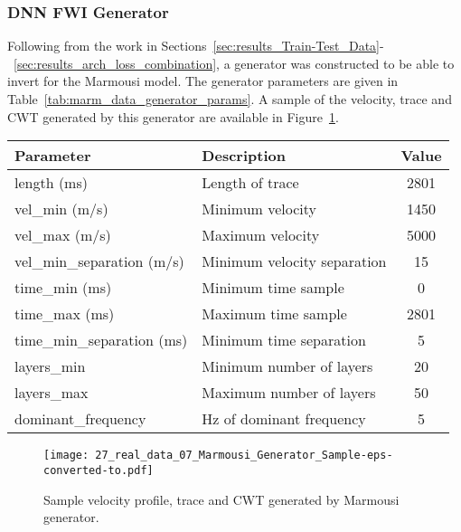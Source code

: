 \subsubsection{DNN FWI Generator}\label{sec:results_marm_generator}
Following from the work in Sections~\ref{sec:results_Train-Test_Data}-~\ref{sec:results_arch_loss_combination}, a generator was constructed to be able to invert for the Marmousi model. The generator parameters are given in Table~\ref{tab:marm_data_generator_params}. A sample of the velocity, trace and CWT generated by this generator are available in Figure~\ref{fig:marm_generator}.
\begin{table*}
    \centering
    \begin{tabular}{@{}llc@{}}\toprule
        Parameter                  & Description                   & Value \\ \hline
        length (ms)                & Length of trace               & 2801  \\
        vel\_min (m/s)             & Minimum velocity              & 1450  \\
        vel\_max (m/s)             & Maximum velocity              & 5000  \\
        vel\_min\_separation (m/s) & Minimum velocity separation   & 15    \\
        time\_min (ms)             & Minimum time sample           & 0     \\
        time\_max (ms)             & Maximum time sample           & 2801  \\
        time\_min\_separation (ms) & Minimum time separation       & 5     \\
        layers\_min                & Minimum number of layers      & 20    \\
        layers\_max                & Maximum number of layers      & 50    \\
        dominant\_frequency        & \si{Hz} of dominant frequency & 5     \\ \hline
    \end{tabular}
    \caption[Marmousi data generator parameters.]{Marmousi data generator parameters.}\label{tab:marm_data_generator_params}
\end{table*}

\begin{figure}[ht!]
    \centering
    \texttt{[image: 27\_real\_data\_07\_Marmousi\_Generator\_Sample-eps-converted-to.pdf]}
    \caption[Sample velocity profile, trace and CWT generated by Marmousi generator.]{Sample velocity profile, trace and CWT generated by Marmousi generator.}
    \label{fig:marm_generator}
\end{figure}

